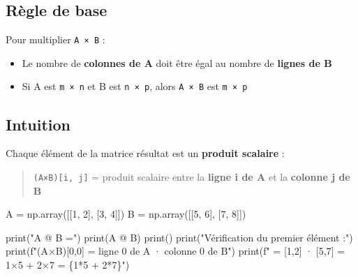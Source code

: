 \documentclass[
  french,
  11pt,
  a4paper,
]{scrbook}
\newenvironment{Shaded}{}{}
\newcommand{\BuiltInTok}[1]{\textcolor[rgb]{0.84,0.23,0.29}{#1}}
\newcommand{\DecValTok}[1]{\textcolor[rgb]{0.00,0.36,0.77}{#1}}
\newcommand{\NormalTok}[1]{\textcolor[rgb]{0.14,0.16,0.18}{#1}}
\newcommand{\OperatorTok}[1]{\textcolor[rgb]{0.14,0.16,0.18}{#1}}
\newcommand{\SpecialCharTok}[1]{\textcolor[rgb]{0.00,0.36,0.77}{#1}}
\newcommand{\SpecialStringTok}[1]{\textcolor[rgb]{0.01,0.18,0.38}{#1}}
\newcommand{\StringTok}[1]{\textcolor[rgb]{0.01,0.18,0.38}{#1}}
\providecommand{\tightlist}{%
  \setlength{\itemsep}{0pt}\setlength{\parskip}{0pt}}
\begin{document}
\subsection{Règle de base}\label{ruxe8gle-de-base}

Pour multiplier \texttt{A\ ×\ B} :

\begin{itemize}
\tightlist
\item
  Le nombre de \textbf{colonnes de A} doit être égal au nombre de
  \textbf{lignes de B}
\item
  Si A est \texttt{m\ ×\ n} et B est \texttt{n\ ×\ p}, alors
  \texttt{A\ ×\ B} est \texttt{m\ ×\ p}
\end{itemize}

\subsection{Intuition}\label{intuition}

Chaque élément de la matrice résultat est un \textbf{produit scalaire} :

\begin{quote}
\texttt{(A×B){[}i,\ j{]}} = produit scalaire entre la \textbf{ligne i de
A} et la \textbf{colonne j de B}
\end{quote}

\begin{Shaded}
\begin{Highlighting}[]
\NormalTok{A }\OperatorTok{=}\NormalTok{ np.array([[}\DecValTok{1}\NormalTok{, }\DecValTok{2}\NormalTok{], [}\DecValTok{3}\NormalTok{, }\DecValTok{4}\NormalTok{]])}
\NormalTok{B }\OperatorTok{=}\NormalTok{ np.array([[}\DecValTok{5}\NormalTok{, }\DecValTok{6}\NormalTok{], [}\DecValTok{7}\NormalTok{, }\DecValTok{8}\NormalTok{]])}

\BuiltInTok{print}\NormalTok{(}\StringTok{"A @ B ="}\NormalTok{)}
\BuiltInTok{print}\NormalTok{(A }\OperatorTok{@}\NormalTok{ B)}
\BuiltInTok{print}\NormalTok{()}
\BuiltInTok{print}\NormalTok{(}\StringTok{"Vérification du premier élément :"}\NormalTok{)}
\BuiltInTok{print}\NormalTok{(}\SpecialStringTok{f"(A×B)[0,0] = ligne 0 de A · colonne 0 de B"}\NormalTok{)}
\BuiltInTok{print}\NormalTok{(}\SpecialStringTok{f"         = [1,2] · [5,7] = 1×5 + 2×7 = }\SpecialCharTok{\{}\DecValTok{1}\OperatorTok{*}\DecValTok{5} \OperatorTok{+} \DecValTok{2}\OperatorTok{*}\DecValTok{7}\SpecialCharTok{\}}\SpecialStringTok{"}\NormalTok{)}
\end{Highlighting}
\end{Shaded}
\end{document}
